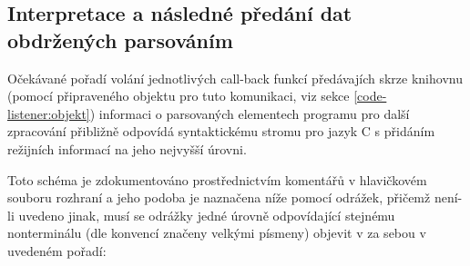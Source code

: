 \subsection{Interpretace a následné předání dat obdržených parsováním}
%
Očekávané pořadí volání jednotlivých call-back funkcí předávajích
skrze knihovnu (pomocí připraveného objektu pro tuto komunikaci,
viz sekce \ref{code-listener:objekt}) informaci o parsovaných elementech
programu pro další zpracování přibližně odpovídá syntaktickému stromu
pro jazyk C s přidáním režijních informací na jeho nejvyšší úrovni.

Toto schéma je zdokumentováno prostřednictvím komentářů v hlavičkovém
souboru rozhraní a jeho podoba je naznačena níže pomocí odrážek,
přičemž není-li uvedeno jinak, musí se odrážky jedné úrovně odpovídající
stejnému nonterminálu (dle konvencí značeny velkými písmeny)
objevit v za sebou v uvedeném pořadí:


